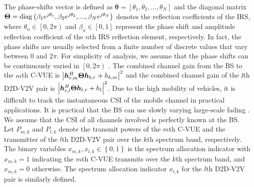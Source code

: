 \documentclass[journal]{IEEEtran}
\begin{document}
The phase-shifts vector is defined as $\bm{\theta  = }\left[ {{\theta _1},{\theta _2},...,{\theta _N}} \right]$ and the diagonal matrix ${\bf{\Theta }} = {\rm{diag}}\left( {{\beta _1}{e^{j{\theta _1}}},{\beta _2}{e^{j{\theta _2}}},...,{\beta _N}{e^{j{\theta _N}}}} \right)$ denotes the reflection coefficients of the IRS, where ${\theta _n} \in \left[ {\left. {0,2\pi } \right)} \right.$ and ${\beta _n} \in \left[ {0,1} \right]$ represent the phase shift and amplitude reflection coefficient of the $n$th IRS reflection element, respectively. In fact, the phase shifts are usually selected from a finite number of discrete values that vary between 0 and $ 2\pi $. For simplicity of analysis, we assume that the phase shifts can be continuously varied in $ \left[ {0,2\pi } \right) $ \cite{IRS-1}. The combined channel gain from the BS to the $m$th C-VUE is ${\left| {\bm{h}_{r,m}^H{\bf{\Theta }}{\bm{h}_{b,r}} + {h_{b,m}}} \right|^2}$ and the combined channel gain of the $l$th D2D-V2V pair is ${\left| {\bm{h}_{r,l}^H{\bf{\Theta }}{\bm{h}_{l,r}} + {h_l}} \right|^2}$. Due to the high mobility of vehicles, it is difficult to track the instantaneous CSI of the mobile channel in practical applications. It is practical that the BS can use slowly varying large-scale fading \cite{IOVRM-6} \cite{IOVRM-28}. We assume that the CSI of all channels involved is perfectly known at the BS. Let $ {P_{m,k}} $ and $ {P_{l,k}} $ denote the transmit powers of the $m$th C-VUE and the transmitter of the $l$th D2D-V2V pair over the $k$th spectrum band, respectively. The binary variables ${x_{m,k}},{x_{l,k}} \in \left\{ {0,1} \right\} $ is the spectrum allocation indicator with $ {x_{m,k}}=1 $ indicating the $m$th C-VUE transmits over the $k$th spectrum band, and $ {x_{m,k}}=0 $ otherwise. The spectrum allocation indicator ${x_{l,k}}$ for the $ l $th D2D-V2V pair is similarly defined.
\end{document}
